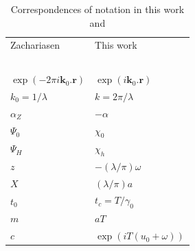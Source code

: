 \documentclass[preprint]{iucr}              %
\begin{document}
\begin{table}
\caption{Correspondences of notation in this work and \cite{ZachariasenBook}}
    \begin{center}
\begin{tabular}{ll}      %
 Zachariasen    & This work     \\
 ~~~\\
$\exp(-2\pi i \textbf{k}_0.\textbf{r})$ & $\exp(i\textbf{k}_0.\textbf{r})$      \\
 $k_0=1/\lambda$ & $k=2 \pi / \lambda$      \\
 $\alpha_Z$      & $-\alpha$                \\
 $\Psi_0$      & $\chi_0$                 \\
 $\Psi_H$      & $\chi_h$                 \\
 $z$           & $-(\lambda/\pi) \omega$  \\
 $X$           & $(\lambda/\pi) a$        \\
 $t_0$         & $t_c=T/\gamma_0$         \\
 $m$           & $a T$                    \\
 $c$  & $\exp(i T (u_0+\omega))$   
 \end{tabular}
     \end{center}
\end{table}






\end{document}
